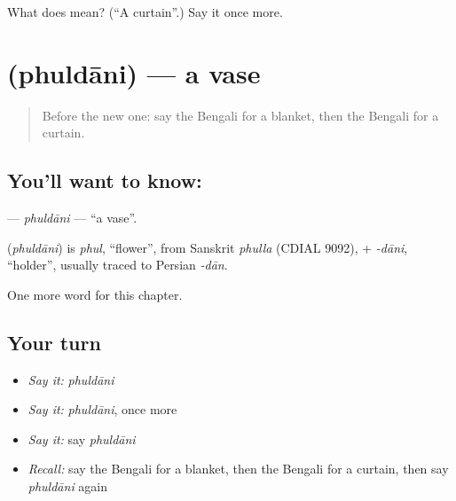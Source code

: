 \begin{tcolorbox}[breakable,colback=teal!4,colframe=teal!35!black,title={Before you move on}]
What does  mean? (\textquotedblleft{}A curtain\textquotedblright{}.) Say it once more.
\end{tcolorbox}
\section[\texorpdfstring{\bn{ফুলদানি} (phuldāni)}{ফুলদানি (phuldāni)}]{ (phuldāni) — a vase}

\label{lesson:BN-C133-phuldani}



\begin{quote}
Before the new one: say the Bengali for a blanket, then the Bengali for a curtain.
\end{quote}

\subsection*{You'll want to know: }
\textbf{} — \emph{phuldāni} — \textquotedblleft{}a vase\textquotedblright{}.

\begin{cousinweb}
\textbf{} (\emph{phuldāni}) is \emph{phul}, \textquotedblleft{}flower\textquotedblright{}, from Sanskrit \emph{phulla} (CDIAL 9092), + \emph{-dāni}, \textquotedblleft{}holder\textquotedblright{}, usually traced to Persian \emph{-dān}.
\end{cousinweb}

\begin{grammarlens}[title={What you've built}]
One more word for this chapter.
\end{grammarlens}

\subsection*{Your turn}
\begin{itemize}
\raggedright
  \item \emph{Say it:} \emph{phuldāni}
  \item \emph{Say it:} \emph{phuldāni}, once more
  \item \emph{Say it:} say \emph{phuldāni}
  \item \emph{Recall:} say the Bengali for a blanket, then the Bengali for a curtain, then say \emph{phuldāni} again
\end{itemize}

